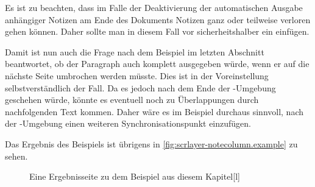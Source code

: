 Es ist zu beachten, dass im Falle der Deaktivierung der
automatischen Ausgabe anhängiger Notizen am Ende des Dokuments Notizen ganz
oder teilweise verloren gehen können. Daher sollte man in diesem Fall vor
 sicherheitshalber ein
 einfügen.

Damit ist nun auch die Frage nach dem Beispiel im letzten Abschnitt
beantwortet, ob der Paragraph auch komplett ausgegeben würde, wenn er auf die
nächste Seite umbrochen werden müsste. Dies ist in der Voreinstellung
selbstverständlich der Fall. Da es jedoch nach dem Ende der
-Umgebung geschehen würde, könnte es eventuell
noch zu Überlappungen durch nachfolgenden Text kommen. Daher wäre es im
Beispiel durchaus sinnvoll, nach der -Umgebung
einen weiteren Synchronisationspunkt einzufügen.

Das Ergebnis des Beispiels ist übrigens in
\autoref{fig:scrlayer-notecolumn.example} zu sehen.

\begin{figure}
  \setcapindent{0pt}%
  \begin{captionbeside}{Eine Ergebnisseite zu dem Beispiel
      aus diesem Kapitel\label{fig:scrlayer-notecolumn.example}}[l]
  \end{captionbeside}
\end{figure}
\EndIndexGroup
%
\EndIndexGroup



